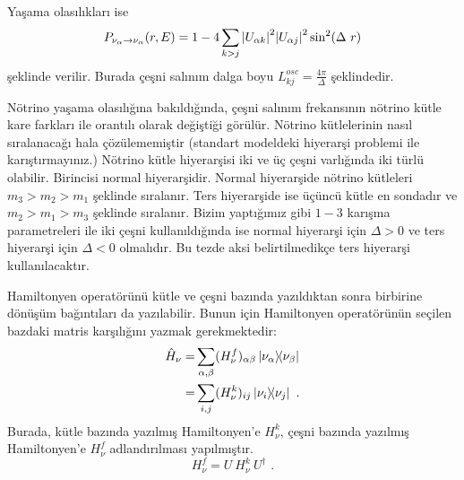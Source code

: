 Yaşama olasılıkları ise
\begin{equation}\label{eqn:SurvivalProbability}
    P_{\nu_{\alpha}\rightarrow\nu_{\alpha}}(r,E)=1-4\sum_{k>j} \abs{U_{\alpha k}}^{2} \abs{U_{\alpha j}}^{2} \sin[2](\Delta~r)
\end{equation}
şeklinde verilir. Burada çeşni salınım dalga boyu $L^{osc}_{kj}=\frac{4\pi}{\Delta}$ şeklindedir. 

Nötrino yaşama olasılığına bakıldığında, çeşni salınım frekansının nötrino kütle kare farkları ile orantılı olarak değiştiği görülür. Nötrino kütlelerinin nasıl sıralanacağı hala çözülememiştir (standart modeldeki hiyerarşi problemi ile karıştırmayınız.) Nötrino kütle hiyerarşisi iki ve üç çeşni varlığında iki türlü olabilir. Birincisi normal hiyerarşidir. Normal hiyerarşide nötrino kütleleri $ m_{3}>m_{2}>m_{1} $ şeklinde sıralanır. Ters hiyerarşide ise üçüncü kütle en sondadır ve $ m_{2}>m_{1}>m_{3} $ şeklinde sıralanır. Bizim yaptığımız gibi $ 1-3 $ karışma parametreleri ile iki çeşni kullanıldığında ise normal hiyerarşi için $ \Delta>0 $ ve ters hiyerarşi için $ \Delta < 0 $ olmalıdır. Bu tezde aksi belirtilmedikçe ters hiyerarşi kullanılacaktır.

Hamiltonyen operatörünü kütle ve çeşni bazında yazıldıktan sonra birbirine dönüşüm bağıntıları da yazılabilir. Bunun için Hamiltonyen operatörünün seçilen bazdaki matris karşılığını yazmak gerekmektedir:
\begin{align}
    \hat{H}_{\nu} =& \sum_{\alpha,\beta} (H_{\nu}^{f})_{\alpha\beta} \dyad{\nu_{\alpha}}{\nu_{\beta}} \\
    =& \sum_{i,j} (H_{\nu}^{k})_{ij} \dyad{\nu_{i}}{\nu_{j}} \text{ .}
\end{align}
Burada, kütle bazında yazılmış Hamiltonyen'e $ H_{\nu}^{k} $, çeşni bazında yazılmış Hamiltonyen'e $ H_{\nu}^{f} $ adlandırılması yapılmıştır.
\begin{equation}\label{eqn:BoslukSal_HamiltBasisChange}
	H_{\nu}^{f} = U~ H_{\nu}^{k}~ U^{\dagger} \text{ .}
\end{equation}

